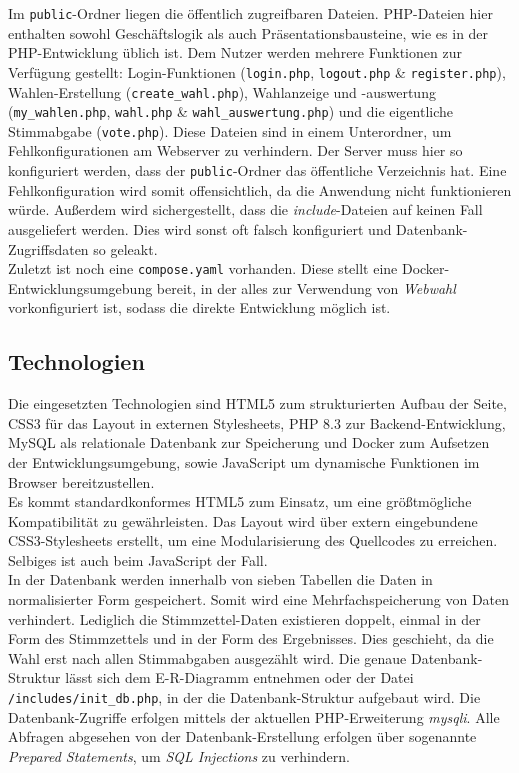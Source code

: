 \documentclass[a4paper]{scrartcl}
\newcommand{\file}[1]{\texttt{#1}}
\begin{document}
	\noindent Im \file{public}-Ordner liegen die öffentlich zugreifbaren Dateien. PHP-Dateien hier enthalten sowohl Geschäftslogik als auch Präsentationsbausteine, wie es in der PHP-Entwicklung üblich ist. Dem Nutzer werden mehrere Funktionen zur Verfügung gestellt: Login-Funktionen (\file{login.php}, \file{logout.php} \& \file{register.php}), Wahlen-Erstellung (\file{create\_wahl.php}), Wahlanzeige und -auswertung (\file{my\_wahlen.php}, \file{wahl.php} \& \file{wahl\_auswertung.php}) und die eigentliche Stimmabgabe (\file{vote.php}). Diese Dateien sind in einem Unterordner, um Fehlkonfigurationen am Webserver zu verhindern. Der Server muss hier so konfiguriert werden, dass der \file{public}-Ordner das öffentliche Verzeichnis hat. Eine Fehlkonfiguration wird somit offensichtlich, da die Anwendung nicht funktionieren würde. Außerdem wird sichergestellt, dass die \textit{include}-Dateien auf keinen Fall ausgeliefert werden. Dies wird sonst oft falsch konfiguriert und Datenbank-Zugriffsdaten so geleakt.\\
	
	\noindent Zuletzt ist noch eine \file{compose.yaml} vorhanden. Diese stellt eine Docker-Entwicklungsumgebung bereit, in der alles zur Verwendung von \textit{Webwahl} vorkonfiguriert ist, sodass die direkte Entwicklung möglich ist.
	
	\subsection{Technologien}
	Die eingesetzten Technologien sind HTML5 zum strukturierten Aufbau der Seite, CSS3 für das Layout in externen Stylesheets, PHP 8.3 zur Backend-Entwicklung, MySQL als relationale Datenbank zur Speicherung und Docker zum Aufsetzen der Entwicklungsumgebung, sowie JavaScript um dynamische Funktionen im Browser bereitzustellen.\\
	
	\noindent Es kommt standardkonformes HTML5 zum Einsatz, um eine größtmögliche Kompatibilität zu gewährleisten. Das Layout wird über extern eingebundene CSS3-Stylesheets erstellt, um eine Modularisierung des Quellcodes zu erreichen. Selbiges ist auch beim JavaScript der Fall.\\
	
	\noindent In der Datenbank werden innerhalb von sieben Tabellen die Daten in normalisierter Form gespeichert. Somit wird eine Mehrfachspeicherung von Daten verhindert. Lediglich die Stimmzettel-Daten existieren doppelt, einmal in der Form des Stimmzettels und in der Form des Ergebnisses. Dies geschieht, da die Wahl erst nach allen Stimmabgaben ausgezählt wird.
	Die genaue Datenbank-Struktur lässt sich dem E-R-Diagramm entnehmen oder der Datei \file{/includes/init\_db.php}, in der die Datenbank-Struktur aufgebaut wird.
	Die Datenbank-Zugriffe erfolgen mittels der aktuellen PHP-Erweiterung \textit{mysqli}. Alle Abfragen abgesehen von der Datenbank-Erstellung erfolgen über sogenannte \textit{Prepared Statements}, um \textit{SQL Injections} zu verhindern. \\
	
\end{document}
